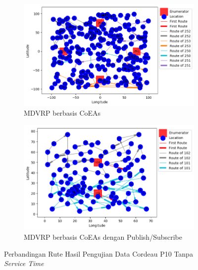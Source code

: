 \begin{figure}[!]
	\centering
	\begin{subfigure}[t]{\textwidth}
		\centering
		\includegraphics[width=\textwidth]{Resources/Images/test_result_cordeau_p10_notw_coes}
		\caption{MDVRP berbasis CoEAs}
		\label{fig:test_result_cordeau_p10_notw_coes}
	\end{subfigure}%
	
	\begin{subfigure}[t]{\textwidth}
		\centering
		\includegraphics[width=\textwidth]{Resources/Images/test_result_cordeau_p04_notw_pubsub_coes}
		\caption{MDVRP berbasis CoEAs dengan Publish/Subscribe}
		\label{fig:test_result_cordeau_p10_notw_pubsub_coes}
	\end{subfigure}
	\caption{Perbandingan Rute Hasil Pengujian Data Cordeau P10 Tanpa \textit{Service Time}}
	\label{fig:test_result_cordeau_p10_notw}
\end{figure}